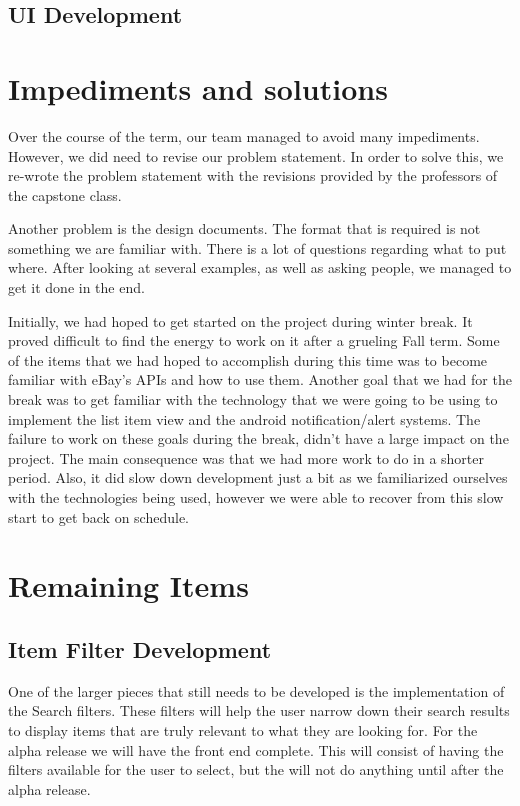 \documentclass[journal,compsoc, 10pt, draftclsnofoot, onecolumn]{IEEEtran}
\begin{document}
\subsection{UI Development} 

\section{Impediments and solutions}
Over the course of the term, our team managed to avoid many impediments. However, 
we did need to revise our problem statement. In order to solve this, we re-wrote the 
problem statement with the revisions provided by the professors of the capstone 
class. \newline

Another problem is the design documents. The format that is required is not 
something we are familiar with. There is a lot of questions regarding what to 
put where. After looking at several examples, as well as asking people, 
we managed to get it done in the end.

Initially, we had hoped to get started on the project during winter break. 
It proved difficult to find the energy to work on it after a grueling Fall 
term. Some of the items that we had hoped to accomplish during this time was 
to become familiar with eBay's APIs and how to use them. Another goal that we 
had for the break was to get familiar with the technology that we were going 
to be using to implement the list item view and the android notification/alert 
systems. The failure to work on these goals during the break, didn't have a 
large impact on the project. The main consequence was that we had more work to 
do in a shorter period. Also, it did slow down development just a bit as we 
familiarized ourselves with the technologies being used, however we were able 
to recover from this slow start to get back on schedule.

\section{Remaining Items}

\subsection{Item Filter Development}
One of the larger pieces that still needs to be developed is the implementation
 of the Search filters. These filters will help the user narrow down their 
search results to display items that are truly relevant to what they are 
looking for. For the alpha release we will have the front end complete. This 
will consist of having the filters available for the user to select, but the 
will not do anything until after the alpha release. 
\end{document}
